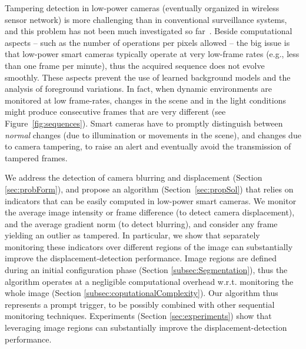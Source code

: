 \documentclass{llncs}
\begin{document}
Tampering detection in low-power cameras (eventually organized in wireless sensor network) is more challenging than in conventional surveillance systems, and this problem has not been much investigated so far~\cite{perrig2004security,alippi2010detecting}. Beside computational aspects -- such as the number of operations per pixels allowed -- the big issue is that low-power smart cameras typically operate at very low-frame rates (e.g., less than one frame per minute), thus the acquired sequence does not evolve smoothly. These aspects prevent the use of learned background models and the analysis of foreground variations. In fact, when dynamic environments are monitored at low frame-rates, changes in the scene and in the light conditions might produce consecutive frames that are very different (see Figure~\ref{fig:sequences}). Smart cameras have to promptly distinguish between \emph{normal} changes (due to illumination or movements in the scene), and changes due to camera tampering, to raise an alert and eventually avoid the transmission of tampered frames. %

We address the detection of camera blurring and displacement (Section \ref{sec:probForm}), and propose an algorithm (Section~\ref{sec:propSol}) that relies on indicators that can be easily computed in low-power smart cameras. We monitor the average image intensity or frame difference (to detect camera displacement), and the average gradient norm (to detect blurring), and consider any frame yielding an outlier as tampered. In particular, we show that separately monitoring these indicators over different regions of the image can substantially improve the displacement-detection performance. Image regions are defined during an initial configuration phase (Section \ref{subsec:Segmentation}), thus the algorithm operates at a negligible computational overhead w.r.t. monitoring the whole image (Section \ref{subsec:coputationalComplexity}). Our algorithm thus represents a prompt trigger, to be possibly combined with other sequential monitoring techniques. Experiments (Section \ref{sec:experiments}) show that leveraging image regions can substantially improve the displacement-detection performance. %
\end{document}
